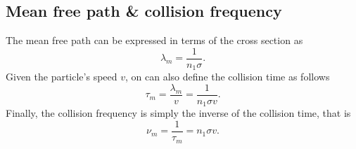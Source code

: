 \documentclass[a4paper,11pt]{report}
\begin{document}
\subsection{Mean free path \& collision frequency}
The mean free path can be expressed in terms of the cross section as
\begin{equation}
    \lambda_m = \frac{1}{n_1 \sigma}.
\end{equation}
Given the particle's speed $v$, on can also define the collision time as follows
\begin{equation}
    \tau_m = \frac{\lambda_m}{v} = \frac{1}{n_1 \sigma v}.
\end{equation}
Finally, the collision frequency is simply the inverse of the collision time, that is
\begin{equation}
    \nu_{m} = \frac{1}{\tau_m} = n_1 \sigma v.
\end{equation}

\end{document}
